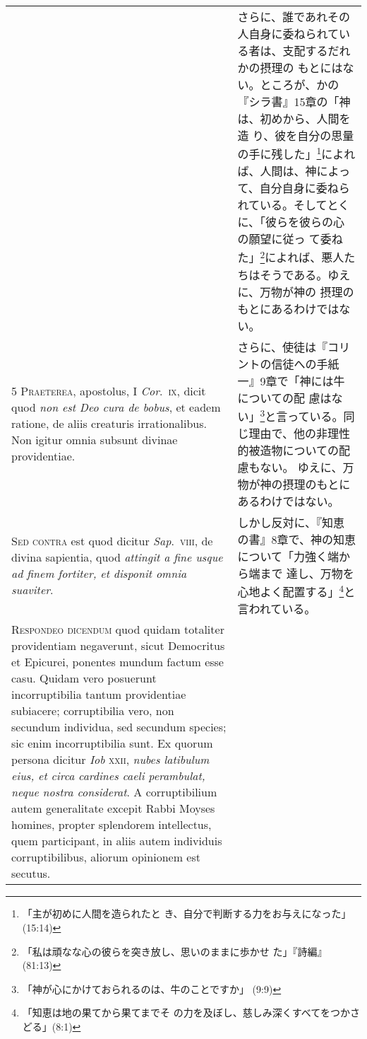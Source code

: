 \documentclass[10pt]{jsarticle} %
\begin{document}
\begin{longtable}{p{21em}p{21em}}
&

さらに、誰であれその人自身に委ねられている者は、支配するだれかの摂理の
もとにはない。ところが、かの『シラ書』15章の「神は、初めから、人間を造
り、彼を自分の思量の手に残した」\footnote{「主が初めに人間を造られたと
き、自分で判断する力をお与えになった」(15:14)}によれば、人間は、神によっ
て、自分自身に委ねられている。そしてとくに、「彼らを彼らの心の願望に従っ
て委ねた」\footnote{「私は頑なな心の彼らを突き放し、思いのままに歩かせ
た」『詩編』(81:13)}によれば、悪人たちはそうである。ゆえに、万物が神の
摂理のもとにあるわけではない。

\\


{\scshape 5 Praeterea}, apostolus, I {\itshape Cor}.~{\scshape ix}, dicit quod
{\itshape non est Deo cura de bobus}, et eadem ratione, de aliis creaturis
irrationalibus. Non igitur omnia subsunt divinae providentiae.

&

さらに、使徒は『コリントの信徒への手紙一』9章で「神には牛についての配
慮はない」\footnote{「神が心にかけておられるのは、牛のことですか」
(9:9)}と言っている。同じ理由で、他の非理性的被造物についての配慮もない。
ゆえに、万物が神の摂理のもとにあるわけではない。


\\


{\scshape Sed contra} est quod dicitur {\itshape Sap}.~{\scshape viii}, de
divina sapientia, quod {\itshape attingit a fine usque ad finem fortiter, et
disponit omnia suaviter}.

&

しかし反対に、『知恵の書』8章で、神の知恵について「力強く端から端まで
達し、万物を心地よく配置する」\footnote{「知恵は地の果てから果てまでそ
の力を及ぼし、慈しみ深くすべてをつかさどる」(8:1)}と言われている。

\\


{\scshape Respondeo dicendum} quod quidam totaliter
providentiam negaverunt, sicut Democritus et Epicurei, ponentes mundum
factum esse casu. Quidam vero posuerunt incorruptibilia tantum
providentiae subiacere; corruptibilia vero, non secundum individua, sed
secundum species; sic enim incorruptibilia sunt. Ex quorum persona
dicitur {\itshape Iob} {\scshape xxii}, {\itshape nubes latibulum eius, et circa cardines caeli
perambulat, neque nostra considerat}. A corruptibilium autem generalitate
excepit Rabbi Moyses homines, propter splendorem intellectus, quem
participant, in aliis autem individuis corruptibilibus, aliorum
opinionem est secutus. 




\end{longtable}
\end{document}
